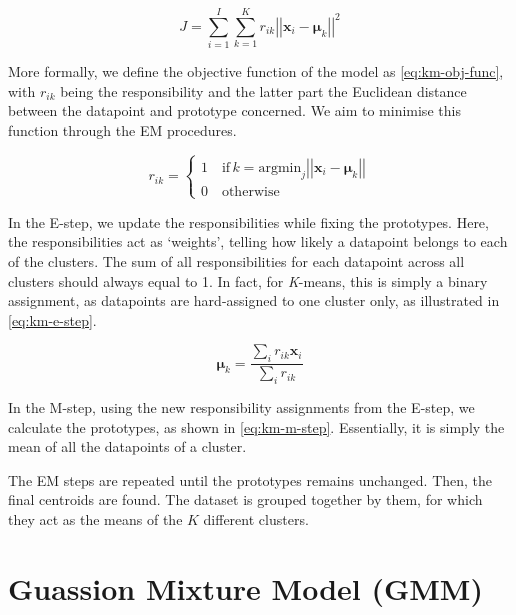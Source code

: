 \documentclass[11pt,openright,a4paper]{article}
\numberwithin{equation}{section}
\begin{document}
\begin{equation} \label{eq:km-obj-func}
    J = \sum_{i=1}^{I} \sum_{k=1}^{K} r_{ik} \left|\left| \boldsymbol{x}_{i} - \boldsymbol{\mu}_{k} \right|\right|^2
\end{equation}

More formally, we define the objective function of the model as \autoref{eq:km-obj-func}, with $r_{ik}$ being the responsibility and the latter part the Euclidean distance between the datapoint and prototype concerned. We aim to minimise this function through the EM procedures.

\begin{equation} \label{eq:km-e-step}
    r_{ik} = 
    \begin{cases}
        1 \quad \mathrm{if} \, k = \mathrm{argmin}_j
                            \left|\left|\boldsymbol{x}_{i} - \boldsymbol{\mu}_{k} \right|\right| \\
        0 \quad \mathrm{otherwise}
    \end{cases}
\end{equation}

In the E-step, we update the responsibilities while fixing the prototypes. Here, the responsibilities act as `weights', telling how likely a datapoint belongs to each of the clusters. The sum of all responsibilities for each datapoint across all clusters should always equal to 1. In fact, for \textit{K}-means, this is simply a binary assignment, as datapoints are hard-assigned to one cluster only, as illustrated in \autoref{eq:km-e-step}.

\begin{equation} \label{eq:km-m-step}
    \boldsymbol\mu_{k} = \frac{\sum_i r_{ik}\boldsymbol{x}_i}{\sum_i r_{ik}}
\end{equation}

In the M-step, using the new responsibility assignments from the E-step, we calculate the prototypes, as shown in \autoref{eq:km-m-step}. Essentially, it is simply the mean of all the datapoints of a cluster.

The EM steps are repeated until the prototypes remains unchanged. Then, the final centroids are found. The dataset is grouped together by them, for which they act as the means of the $K$ different clusters.



\section{Guassion Mixture Model (GMM)} \label{sec:gmm}
\end{document}
